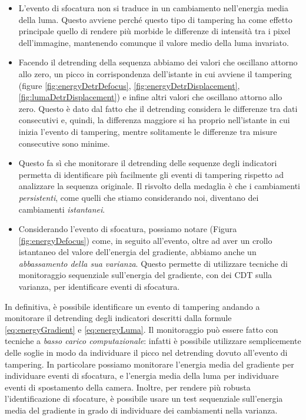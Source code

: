 \begin{itemize}
	\item L'evento di sfocatura non si traduce in un cambiamento nell'energia media della luma.
	Questo avviene perch\'e questo tipo di tampering ha come effetto principale quello di rendere pi\`u morbide le differenze di intensit\`a tra i pixel dell'immagine, mantenendo comunque il valore medio della luma invariato.
	\item Facendo il detrending della sequenza abbiamo dei valori che oscillano attorno allo zero, un picco in corrispondenza dell'istante in cui avviene il tampering (figure \ref{fig:energyDetrDefocus}, \ref{fig:energyDetrDisplacement}, \ref{fig:lumaDetrDisplacement}) e infine altri valori che oscillano attorno allo zero.
	Questo \`e dato dal fatto che il detrending considera le differenze tra dati consecutivi e, quindi, la differenza maggiore si ha proprio nell'istante in cui inizia l'evento di tampering, mentre solitamente le differenze tra misure consecutive sono minime. 
	\item Questo fa s\`i che monitorare il detrending delle sequenze degli indicatori permetta di identificare pi\`u facilmente gli eventi di tampering rispetto ad analizzare la sequenza originale.
	Il risvolto della medaglia \`e che i cambiamenti \textit{persistenti}, come quelli che stiamo considerando noi, diventano dei cambiamenti \textit{istantanei}.
	\item Considerando l'evento di sfocatura, possiamo notare (Figura \ref{fig:energyDefocus}) come, in seguito all'evento, oltre ad aver un crollo istantaneo del valore dell'energia del gradiente, abbiamo anche un \textit{abbassamento della sua varianza}.
	Questo permette di utilizzare tecniche di monitoraggio sequenziale sull'energia del gradiente, con dei CDT sulla varianza, per identificare eventi di sfocatura.
\end{itemize}
In definitiva, \`e possibile identificare un evento di tampering andando a monitorare il detrending degli indicatori descritti dalla formule \eqref{eq:energyGradient} e \eqref{eq:energyLuma}.
Il monitoraggio pu\`o essere fatto con tecniche a \textit{basso carico computazionale}: infatti \`e possibile utilizzare semplicemente delle soglie in modo da individuare il picco nel detrending dovuto all'evento di tampering.
In particolare possiamo monitorare l'energia media del gradiente per individuare eventi di sfocatura, e l'energia media della luma per individuare eventi di spostamento della camera.
Inoltre, per rendere pi\`u robusta l'identificazione di sfocature, \`e possibile usare un test sequenziale sull'energia media del gradiente in grado di individuare dei cambiamenti nella varianza.\\
